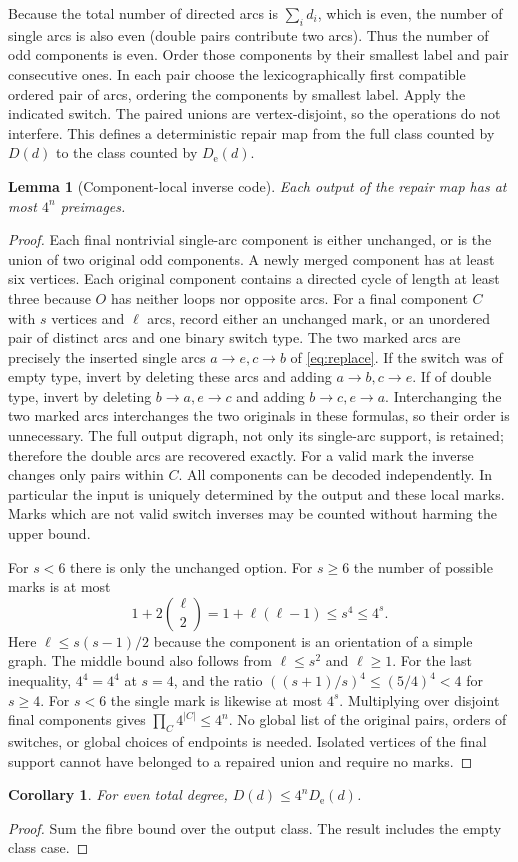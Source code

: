 \documentclass[11pt]{article}
\newtheorem{lemma}[theorem]{Lemma}
\newtheorem{corollary}[theorem]{Corollary}
\theoremstyle{remark}\newtheorem{remark}[theorem]{Remark}
\newcommand{\De}{D_{\mathrm e}}
\begin{document}
Because the total number of directed arcs is $\sum_i d_i$, which is even, the number of single arcs is also even (double pairs contribute two arcs). Thus the number of odd components is even. Order those components by their smallest label and pair consecutive ones. In each pair choose the lexicographically first compatible ordered pair of arcs, ordering the components by smallest label. Apply the indicated switch. The paired unions are vertex-disjoint, so the operations do not interfere. This defines a deterministic repair map from the full class counted by $D(d)$ to the class counted by $\De(d)$.

\begin{lemma}[Component-local inverse code]\label{lem:fibers}
Each output of the repair map has at most $4^n$ preimages.
\end{lemma}
\begin{proof}
Each final nontrivial single-arc component is either unchanged, or is the union of two original odd components. A newly merged component has at least six vertices. Each original component contains a directed cycle of length at least three because $O$ has neither loops nor opposite arcs. For a final component $C$ with $s$ vertices and $\ell$ arcs, record either an unchanged mark, or an unordered pair of distinct arcs and one binary switch type. The two marked arcs are precisely the inserted single arcs $a\to e,c\to b$ of \eqref{eq:replace}. If the switch was of empty type, invert by deleting these arcs and adding $a\to b,c\to e$. If of double type, invert by deleting $b\to a,e\to c$ and adding $b\to c,e\to a$. Interchanging the two marked arcs interchanges the two originals in these formulas, so their order is unnecessary. The full output digraph, not only its single-arc support, is retained; therefore the double arcs are recovered exactly. For a valid mark the inverse changes only pairs within $C$. All components can be decoded independently. In particular the input is uniquely determined by the output and these local marks. Marks which are not valid switch inverses may be counted without harming the upper bound.

For $s<6$ there is only the unchanged option. For $s\ge6$ the number of possible marks is at most
\[
 1+2\binom{\ell}{2}=1+\ell(\ell-1)\le s^4\le4^s.
\]
Here $\ell\le s(s-1)/2$ because the component is an orientation of a simple graph. The middle bound also follows from $\ell\le s^2$ and $\ell\ge1$. For the last inequality, $4^4=4^4$ at $s=4$, and the ratio $((s+1)/s)^4\le(5/4)^4<4$ for $s\ge4$. For $s<6$ the single mark is likewise at most $4^s$. Multiplying over disjoint final components gives $\prod_C4^{|C|}\le4^n$. No global list of the original pairs, orders of switches, or global choices of endpoints is needed. Isolated vertices of the final support cannot have belonged to a repaired union and require no marks.
\end{proof}
\begin{corollary}\label{cor:repair}
For even total degree, $D(d)\le4^n\De(d)$.
\end{corollary}
\begin{proof}
Sum the fibre bound over the output class. The result includes the empty class case.
\end{proof}
\end{document}
